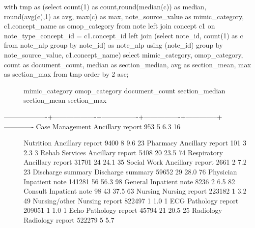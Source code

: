 \begin{description}
\item[with tmp as (select count(1) as count,round(median(c)) as median,
round(avg(c),1) as avg, max(c) as max, note\_source\_value as
mimic\_category, c1.concept\_name as omop\_category from note left join
concept c1 on note\_type\_concept\_id = c1.concept\_id left join (select
note\_id, count(1) as c from note\_nlp group by note\_id) as note\_nlp
using (note\_id) group by note\_source\_value, c1.concept\_name) select
mimic\_category, omop\_category, count as document\_count, median as
section\_median, avg as section\_mean, max as section\_max from tmp
order by 2 asc;]
mimic\_category \textbar{} omop\_category \textbar{} document\_count
\textbar{} section\_median \textbar{} section\_mean \textbar{}
section\_max
\item[-------------------+-------------------+----------------+----------------+--------------+-------------
Case Management \textbar{} Ancillary report \textbar{} 953 \textbar{} 5
\textbar{} 6.3 \textbar{} 16]
Nutrition \textbar{} Ancillary report \textbar{} 9400 \textbar{} 8
\textbar{} 9.6 \textbar{} 23 Pharmacy \textbar{} Ancillary report
\textbar{} 101 \textbar{} 3 \textbar{} 2.3 \textbar{} 3 Rehab Services
\textbar{} Ancillary report \textbar{} 5408 \textbar{} 20 \textbar{}
23.5 \textbar{} 74 Respiratory \textbar{} Ancillary report \textbar{}
31701 \textbar{} 24 \textbar{} 24.1 \textbar{} 35 Social Work \textbar{}
Ancillary report \textbar{} 2661 \textbar{} 2 \textbar{} 7.2 \textbar{}
23 Discharge summary \textbar{} Discharge summary \textbar{} 59652
\textbar{} 29 \textbar{} 28.0 \textbar{} 76 Physician \textbar{}
Inpatient note \textbar{} 141281 \textbar{} 56 \textbar{} 56.3
\textbar{} 98 General \textbar{} Inpatient note \textbar{} 8236
\textbar{} 2 \textbar{} 6.5 \textbar{} 82 Consult \textbar{} Inpatient
note \textbar{} 98 \textbar{} 43 \textbar{} 37.5 \textbar{} 63 Nursing
\textbar{} Nursing report \textbar{} 223182 \textbar{} 1 \textbar{} 3.2
\textbar{} 49 Nursing/other \textbar{} Nursing report \textbar{} 822497
\textbar{} 1 \textbar{} 1.0 \textbar{} 1 ECG \textbar{} Pathology report
\textbar{} 209051 \textbar{} 1 \textbar{} 1.0 \textbar{} 1 Echo
\textbar{} Pathology report \textbar{} 45794 \textbar{} 21 \textbar{}
20.5 \textbar{} 25 Radiology \textbar{} Radiology report \textbar{}
522279 \textbar{} 5 \textbar{} 5.7 \textbar{}
\end{description}


